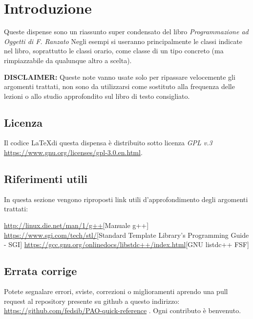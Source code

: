 \chapter{Introduzione}
Queste dispense sono un riassunto super condensato del libro \textit{Programmazione ad Oggetti di F. Ranzato}
Negli esempi si useranno principalmente le classi indicate nel libro, soprattutto le classi orario, come classe di un tipo concreto (ma rimpiazzabile da qualunque altro a scelta). 

\textbf{DISCLAIMER:} Queste note vanno usate solo per ripassare velocemente gli argomenti trattati, non sono da utilizzarsi come sostituto alla frequenza delle lezioni o allo studio approfondito sul libro di testo consigliato.

\section{Licenza}
Il codice \LaTeX di questa dispensa è distribuito sotto licenza \textit{GPL v.3} \url{https://www.gnu.org/licenses/gpl-3.0.en.html}.


\section{Riferimenti utili}
In questa sezione vengono riproposti link utili d'approfondimento degli argomenti trattati:

\url{http://linux.die.net/man/1/g++}[Manuale g++]
\url{https://www.sgi.com/tech/stl/}[Standard Template Library's Programming Guide - SGI]
\url{https://gcc.gnu.org/onlinedocs/libstdc++/index.html}[GNU listdc++ FSF]
\section{Errata corrige}

Potete segnalare errori, sviste, correzioni o miglioramenti aprendo una pull request al repository presente su github a questo indirizzo:
\url{https://github.com/fedsib/PAO-quick-reference} . Ogni contributo è benvenuto.